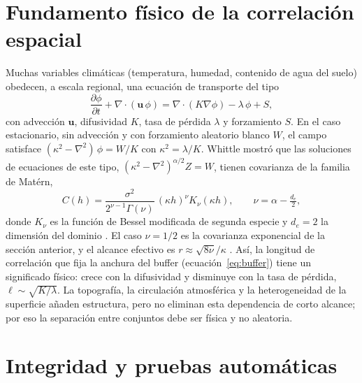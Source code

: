 \documentclass[11pt,a4paper]{article}
\newcommand{\vect}[1]{\mathbf{#1}}
\begin{document}
\TablaParticion

\section{Fundamento físico de la correlación espacial}

Muchas variables climáticas (temperatura, humedad, contenido de agua del suelo) obedecen, a escala
regional, una ecuación de transporte del tipo
\begin{equation}
  \frac{\partial\phi}{\partial t} + \nabla\cdot(\vect u\,\phi) = \nabla\cdot(K\nabla\phi) - \lambda\,\phi + S,
\end{equation}
con advección $\vect u$, difusividad $K$, tasa de pérdida $\lambda$ y forzamiento $S$. En el caso
estacionario, sin advección y con forzamiento aleatorio blanco $W$, el campo satisface
$(\kappa^2 - \nabla^2)\,\phi = W/K$ con $\kappa^2 = \lambda/K$. Whittle \cite{whittle1954} mostró que
las soluciones de ecuaciones de este tipo, $(\kappa^2 - \nabla^2)^{\alpha/2}Z = W$, tienen covarianza de
la familia de Matérn,
\begin{equation}
  C(h) = \frac{\sigma^2}{2^{\nu-1}\Gamma(\nu)}\,(\kappa h)^{\nu} K_{\nu}(\kappa h),\qquad
  \nu = \alpha - \tfrac{d_e}{2},
\end{equation}
donde $K_\nu$ es la función de Bessel modificada de segunda especie y $d_e = 2$ la dimensión del
dominio \cite{lindgren2011}. El caso $\nu = 1/2$ es la covarianza exponencial de la sección anterior, y
el alcance efectivo es $r\approx\sqrt{8\nu}/\kappa$ \cite{lindgren2011}. Así, la longitud de
correlación que fija la anchura del buffer (ecuación~\ref{eq:buffer}) tiene un significado físico: crece
con la difusividad y disminuye con la tasa de pérdida, $\ell\sim\sqrt{K/\lambda}$. La topografía, la
circulación atmosférica y la heterogeneidad de la superficie añaden estructura, pero no eliminan esta
dependencia de corto alcance; por eso la separación entre conjuntos debe ser física y no aleatoria.

\section{Integridad y pruebas automáticas}
\end{document}
